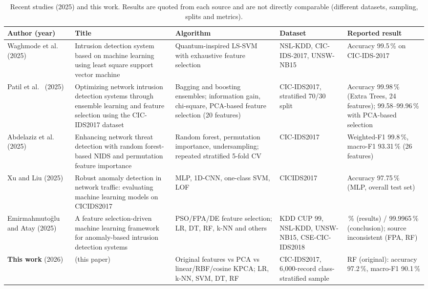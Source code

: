 \documentclass[runningheads]{llncs}
\begin{document}
\begin{table}[htbp]
\caption{Recent studies (2025) and this work. Results are quoted from each source and are not directly comparable (different datasets, sampling, splits and metrics).}\label{tab:lit}
\centering\scriptsize
\renewcommand{\arraystretch}{1.15}
\begin{tabular}{@{}>{\raggedright\arraybackslash}p{2.3cm}>{\raggedright\arraybackslash}p{3.3cm}>{\raggedright\arraybackslash}p{2.4cm}>{\raggedright\arraybackslash}p{1.7cm}>{\raggedright\arraybackslash}p{1.7cm}@{}}
\toprule
Author (year) & Title & Algorithm & Dataset & Reported result \\
\midrule
Waghmode et al.\ \cite{waghmode2025} (2025) & Intrusion detection system based on machine learning using least square support vector machine & Quantum-inspired LS-SVM with exhaustive feature selection & NSL-KDD, CIC-IDS-2017, UNSW-NB15 & Accuracy 99.5\,\% on CIC-IDS-2017 \\
Patil et al.\ \cite{patil2025} (2025) & Optimizing network intrusion detection systems through ensemble learning and feature selection using the CIC-IDS2017 dataset & Bagging and boosting ensembles; information gain, chi-square, PCA-based feature selection (20 features) & CIC-IDS2017, stratified 70/30 split & Accuracy 99.98\,\% (Extra Trees, 24 features); 99.58--99.96\,\% with PCA-based selection \\
Abdelaziz et al.\ \cite{abdelaziz2025} (2025) & Enhancing network threat detection with random forest-based NIDS and permutation feature importance & Random forest, permutation importance, undersampling; repeated stratified 5-fold CV & CIC-IDS2017 & Weighted-F1 99.8\,\%, macro-F1 93.31\,\% (26 features) \\
Xu and Liu \cite{xu2025} (2025) & Robust anomaly detection in network traffic: evaluating machine learning models on CICIDS2017 & MLP, 1D-CNN, one-class SVM, LOF & CICIDS2017 & Accuracy 97.75\,\% (MLP, overall test set) \\
Emirmahmuto\u{g}lu and Atay \cite{emirmahmutoglu2025} (2025) & A feature selection-driven machine learning framework for anomaly-based intrusion detection systems & PSO/FPA/DE feature selection; LR, DT, RF, k-NN and others & KDD CUP 99, NSL-KDD, UNSW-NB15, CSE-CIC-IDS2018 & 99.987\,\% (results) / 99.9965\,\% (conclusion); source inconsistent (FPA, RF) \\
\midrule
\textbf{This work} (2026) & (this paper) & Original features vs PCA vs linear/RBF/cosine KPCA; LR, k-NN, SVM, DT, RF & CIC-IDS2017, 6,000-record class-stratified sample & RF (original): accuracy 97.2\,\%, macro-F1 90.1\,\% \\
\bottomrule
\end{tabular}
\end{table}
\end{document}
